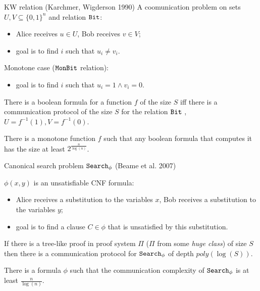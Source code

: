 \begin{frame}{KW relation (Karchmer, Wigderson 1990)}
    A coomunication problem on sets $U, V \subseteq \{0, 1\}^{n}$ and relation $\mathtt{Bit}$:
    \begin{itemize}
        \item Alice receives $u \in U$, Bob receives $v \in V$;
        \item goal is to find $i$ such that $u_i \neq v_i$.
    \end{itemize}
    \pause
    Monotone case ($\mathtt{MonBit}$ relation):
    \begin{itemize}
        \item goal is to find $i$ such that $u_i = 1 \land v_i = 0$.
    \end{itemize}

    \pause

    \begin{theorem}
        There is a  boolean formula for a function $f$ of the size $S$ iff there is a
        communication protocol of the size $S$ for the relation $\mathtt{Bit}$ , $U = f^{-1}(1), V =
        f^{-1}(0)$.
    \end{theorem}

    \pause
    \pause
    
    \begin{theorem}[Pitassi, G{\"{o}}{\"{o}}s, 2014]
        There is a monotone function $f$ such that any boolean formula that computes it has the size at least
        $2^{\frac{n}{\log(n)}}$. 
    \end{theorem}
\end{frame}

\begin{frame}{Canonical search problem $\mathtt{Search}_{\phi}$ (Beame et al. 2007)}
    
    $\phi(x, y)$ is an unsatisfiable CNF formula:
    \begin{itemize}
        \item Alice receives a substitution to the variables $x$, Bob receives a substitution to the variables $y$;
        \item goal is to find a clause $C \in \phi$ that is unsatisfied by this substitution.
    \end{itemize}

    \pause

    \begin{theorem}
        If there is a tree-like proof in proof system $\Pi$ ($\Pi$ from some \textit{huge class}) of size $S$ then there is a
        communication protocol for $\mathtt{Search}_{\phi}$ of depth $poly(\log(S))$.
    \end{theorem}

    \pause
    
    \begin{theorem}[Pitassi, G{\"{o}}{\"{o}}s, 2014]
        There is a formula $\phi$ such that the communication complexity of $\mathtt{Search}_{\phi}$ is at least $\frac{n}{\log(n)}$.
    \end{theorem}
\end{frame}

